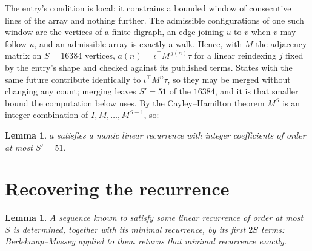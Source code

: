 \documentclass[11pt,a4paper]{article}
\theoremstyle{plain}
\newtheorem{lemma}[theorem]{Lemma}
\theoremstyle{definition}
\begin{document}
The entry's condition is local: it constrains a bounded window of consecutive lines of the
array and nothing further. The admissible configurations of one such window are the vertices
of a finite digraph, an edge joining $u$ to $v$ when $v$ may follow $u$, and an admissible
array is exactly a walk. Hence, with $M$ the adjacency matrix on $S=16384$ vertices,
$a(n)=\iota^{\!\top}M^{\,j(n)}\tau$ for a linear reindexing $j$ fixed by the entry's shape
and checked against its published terms. States with the same future contribute identically to $\iota^{\!\top}M^n\tau$, so they may be merged without changing any count; merging leaves $S'=51$ of the $16384$, and it is that smaller bound the computation below uses. By the Cayley--Hamilton theorem $M^{S}$ is an
integer combination of $I,M,\dots,M^{S-1}$, so:

\begin{lemma}\label{lem:cf}
$a$ satisfies a monic linear recurrence with integer coefficients of order at most
$S'=51$.
\end{lemma}

\section{Recovering the recurrence}

\begin{lemma}\label{lem:bm}
A sequence known to satisfy some linear recurrence of order at most $S$ is determined, together
with its minimal recurrence, by its first $2S$ terms: Berlekamp--Massey applied to them returns
that minimal recurrence exactly.
\end{lemma}
\end{document}
